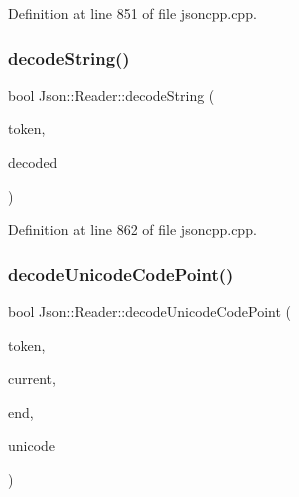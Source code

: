 Definition at line 851 of file jsoncpp.\+cpp.

\hypertarget{class_json_1_1_reader_a8911a3225ee94d86d83edc2f8c1befe0}{}\label{class_json_1_1_reader_a8911a3225ee94d86d83edc2f8c1befe0} 
\subsubsection{\texorpdfstring{decode\+String()}{decodeString()}\hspace{0.1cm}{\footnotesize\ttfamily [4/4]}}
{\footnotesize\ttfamily bool Json\+::\+Reader\+::decode\+String (\begin{DoxyParamCaption}\item[{\hyperlink{class_json_1_1_reader_1_1_token}{Token} \&}]{token,  }\item[{\hyperlink{config_8h_a1e723f95759de062585bc4a8fd3fa4be}{J\+S\+O\+N\+C\+P\+P\+\_\+\+S\+T\+R\+I\+NG} \&}]{decoded }\end{DoxyParamCaption})\hspace{0.3cm}{\ttfamily [private]}}



Definition at line 862 of file jsoncpp.\+cpp.

\hypertarget{class_json_1_1_reader_a8fe24db3e9953aef3d637a56447e795c}{}\label{class_json_1_1_reader_a8fe24db3e9953aef3d637a56447e795c} 
\subsubsection{\texorpdfstring{decode\+Unicode\+Code\+Point()}{decodeUnicodeCodePoint()}\hspace{0.1cm}{\footnotesize\ttfamily [1/2]}}
{\footnotesize\ttfamily bool Json\+::\+Reader\+::decode\+Unicode\+Code\+Point (\begin{DoxyParamCaption}\item[{\hyperlink{class_json_1_1_reader_1_1_token}{Token} \&}]{token,  }\item[{\hyperlink{class_json_1_1_reader_a46795b5b272bf79a7730e406cb96375a}{Location} \&}]{current,  }\item[{\hyperlink{class_json_1_1_reader_a46795b5b272bf79a7730e406cb96375a}{Location}}]{end,  }\item[{unsigned int \&}]{unicode }\end{DoxyParamCaption})\hspace{0.3cm}{\ttfamily [private]}}

